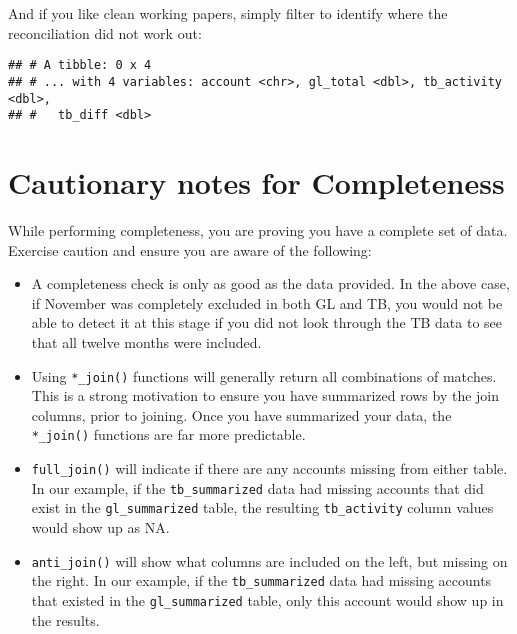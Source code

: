 \documentclass[
]{book}
\newenvironment{Shaded}{\begin{snugshade}}{\end{snugshade}}
\newcommand{\DataTypeTok}[1]{\textcolor[rgb]{0.13,0.29,0.53}{#1}}
\newcommand{\DecValTok}[1]{\textcolor[rgb]{0.00,0.00,0.81}{#1}}
\newcommand{\KeywordTok}[1]{\textcolor[rgb]{0.13,0.29,0.53}{\textbf{#1}}}
\newcommand{\NormalTok}[1]{#1}
\newcommand{\OperatorTok}[1]{\textcolor[rgb]{0.81,0.36,0.00}{\textbf{#1}}}
\newcommand{\StringTok}[1]{\textcolor[rgb]{0.31,0.60,0.02}{#1}}
\begin{document}
And if you like clean working papers, simply filter to identify where the reconciliation did not work out:

\begin{Shaded}
\end{Shaded}

\begin{verbatim}
## # A tibble: 0 x 4
## # ... with 4 variables: account <chr>, gl_total <dbl>, tb_activity <dbl>,
## #   tb_diff <dbl>
\end{verbatim}

\hypertarget{cautionary-notes-for-completeness}{%
\section{Cautionary notes for Completeness}\label{cautionary-notes-for-completeness}}

While performing completeness, you are proving you have a complete set of data. Exercise caution and ensure you are aware of the following:

\begin{itemize}
\item
  A completeness check is only as good as the data provided. In the above case, if November was completely excluded in both GL and TB, you would not be able to detect it at this stage if you did not look through the TB data to see that all twelve months were included.
\item
  Using \texttt{*\_join()} functions will generally return all combinations of matches. This is a strong motivation to ensure you have summarized rows by the join columns, prior to joining. Once you have summarized your data, the \texttt{*\_join()} functions are far more predictable.
\item
  \texttt{full\_join()} will indicate if there are any accounts missing from either table. In our example, if the \texttt{tb\_summarized} data had missing accounts that did exist in the \texttt{gl\_summarized} table, the resulting \texttt{tb\_activity} column values would show up as NA.
\item
  \texttt{anti\_join()} will show what columns are included on the left, but missing on the right. In our example, if the \texttt{tb\_summarized} data had missing accounts that existed in the \texttt{gl\_summarized} table, only this account would show up in the results.
\end{itemize}
\end{document}
